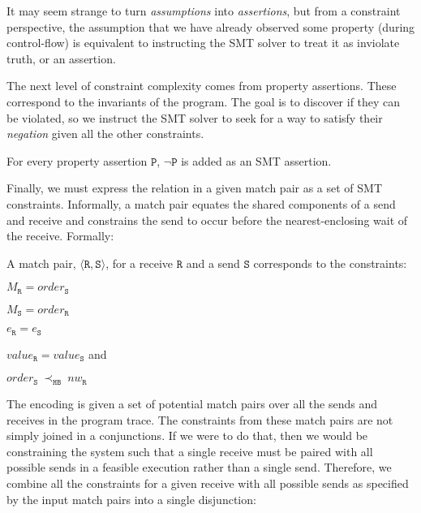 It may seem strange to turn \emph{assumptions} into
\emph{assertions}, but from a constraint perspective, the assumption
that we have already observed some property (during control-flow) is
equivalent to instructing the SMT solver to treat it as inviolate
truth, or an assertion.

The next level of constraint complexity comes from property
assertions. These correspond to the invariants of the program. The
goal is to discover if they can be violated, so we instruct the SMT
solver to seek for a way to satisfy their \emph{negation} given all
the other constraints.

\begin{definition} \label{def:assert}
For every property assertion $\mathtt{P}$, $\neg \mathtt{P}$ is added as
an SMT assertion.
\end{definition}

Finally, we must express the relation in a given match pair as a set of SMT
constraints. Informally, a match pair equates the shared components of
a send and receive and constrains the send to occur before the
nearest-enclosing wait of the receive. Formally:

\begin{definition} \label{def:match}
A match pair, $\langle\mathtt{R}, \mathtt{S}\rangle$, for a receive
$\mathtt{R}$ and a send $\mathtt{S}$ corresponds to the constraints:
\begin{compactenum}
\item $M_{\mathtt{R}} = \mathit{order}_{\mathtt{S}}$
\item $M_{\mathtt{S}} = \mathit{order}_{\mathtt{R}}$
\item $e_{\mathtt{R}} = e_{\mathtt{S}}$
\item $\mathit{value}_{\mathtt{R}} = \mathit{value}_{\mathtt{S}}$ and
\item $\mathit{order}_{\mathtt{S}}\ \mathrm{\prec_\mathtt{HB}}\ \mathit{nw}_{\mathtt{R}}$
\end{compactenum}
\end{definition}

The encoding is given a set of potential match pairs over all the
sends and receives in the program trace. The constraints from these
match pairs are not simply joined in a conjunctions. If we were to do that, then we
would be constraining the system such that a single receive must be
paired with all possible sends in a feasible execution rather than a
single send. Therefore, we combine all the constraints for a given
receive with all possible sends as specified by the input match pairs
into a single disjunction:

